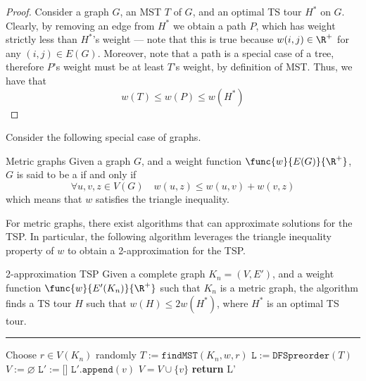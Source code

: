 \documentclass[a4paper, 12pt]{report}
\begin{document}
    \begin{proof}
        Consider a graph $G$, an MST $T$ of $G$, and an optimal TS tour $H^*$ on $G$. Clearly, by removing an edge from $H^*$ we obtain a path $P$, which has weight strictly less than $H^*$'s weight --- note that this is true because $w(i, j) \in \R^+$ for any $(i, j) \in E(G)$. Moreover, note that a path is a special case of a tree, therefore $P$'s weight must be at least $T$'s weight, by definition of MST. Thus, we have that $$w(T) \le w(P) \le w(H^*)$$
    \end{proof}

    Consider the following special case of graphs.

    \begin{frameddefn}{Metric graphs}
        Given a graph $G$, and a weight function $\func{w}{E(G)}{\R^+}$, $G$ is said to be a  if and only if $$\forall u, v, z \in V(G) \quad w(u, z) \le w(u, v) + w(v, z)$$ which means that $w$ satisfies the triangle inequality.
    \end{frameddefn}

    For metric graphs, there exist algorithms that can approximate solutions for the TSP. In particular, the following algorithm leverages the triangle inequality property of $w$ to obtain a 2-approximation for the TSP.

    \begin{framedalgo}{2-approximation TSP}
        Given a complete graph $K_n = (V, E')$, and a weight function $\func{w}{E'(K_n)}{\R^+}$ such that $K_n$ is a metric graph, the algorithm finds a TS tour $H$ such that $w(H) \le 2w(H^*)$, where $H^*$ is an optimal TS tour. \\
        \hrule

        \quad
        \label{alg:2-approx_tsp}
        \begin{algorithmic}[1]
                \State Choose $r \in V(K_n)$ randomly
                \State $T := \texttt{findMST}(K_n, w, r)$ 
                \State $\texttt L := \texttt{DFSpreorder}(T)$ 
                \State $V := \varnothing$
                \State $\texttt L' := \texttt{[]}$
                        \State $\texttt L'.\texttt{append}(v)$
                        \State $V = V \cup \{v\}$
                    \EndIf
                \EndFor
                \State \textbf{return} \ttt L' 
            \EndFunction
        \end{algorithmic}
    \end{framedalgo}
\end{document}
